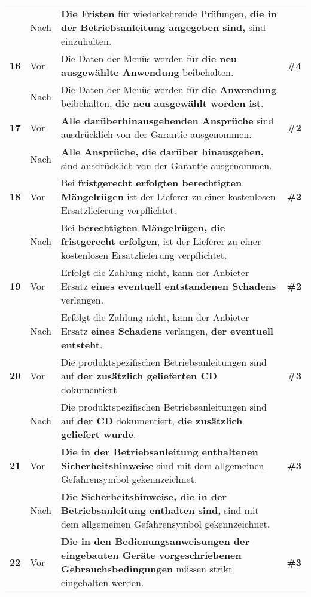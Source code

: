 \begin{longtable}{llp{}l}
& Nach & \textbf{Die Fristen} für wiederkehrende Prüfungen, \textbf{die in der Betriebsanleitung angegeben sind,} sind einzuhalten. & \\
\tablevspace
{ \textbf{16}} & Vor & Die Daten der Menüs werden für \textbf{die neu ausgewählte Anwendung} beibehalten. & \textbf{\#4}\\
& Nach & Die Daten der Menüs werden für \textbf{die Anwendung} beibehalten, \textbf{die neu ausgewählt worden ist}. & \\
\tablevspace
{ \textbf{17}} & Vor & \textbf{Alle darüberhinausgehenden Ansprüche} sind ausdrücklich von der Garantie ausgenommen. & \textbf{\#2}\\
& Nach & \textbf{Alle Ansprüche, die darüber hinausgehen,} sind ausdrücklich von der Garantie ausgenommen. & \\
\tablevspace
{ \textbf{18}} & Vor & Bei \textbf{fristgerecht erfolgten berechtigten Mängelrügen} ist der Lieferer zu einer kostenlosen Ersatzlieferung verpflichtet. & \textbf{\#2}\\
& Nach & Bei \textbf{berechtigten Mängelrügen, die fristgerecht erfolgen}, ist der Lieferer zu einer kostenlosen Ersatzlieferung verpflichtet. & \\
\tablevspace
{ \textbf{19}} & Vor & Erfolgt die Zahlung nicht, kann der Anbieter Ersatz \textbf{eines eventuell entstandenen Schadens} verlangen. & \textbf{\#2}\\
& Nach & Erfolgt die Zahlung nicht, kann der Anbieter Ersatz \textbf{eines Schadens} verlangen, \textbf{der eventuell entsteht}. & \\
\tablevspace
{ \textbf{20}} & Vor & Die produktspezifischen Betriebsanleitungen sind auf \textbf{der zusätzlich gelieferten CD} dokumentiert. & \textbf{\#3}\\
& Nach & Die produktspezifischen Betriebsanleitungen sind auf \textbf{der CD} dokumentiert, \textbf{die zusätzlich geliefert wurde}. & \\
\tablevspace
{ \textbf{21}} & Vor & \textbf{Die in der Betriebsanleitung enthaltenen Sicherheitshinweise} sind mit dem allgemeinen Gefahrensymbol gekennzeichnet. & \textbf{\#3}\\
& Nach & \textbf{Die Sicherheitshinweise, die in der Betriebsanleitung enthalten sind,} sind mit dem allgemeinen Gefahrensymbol gekennzeichnet. & \\
\tablevspace
{ \textbf{22}} & Vor & \textbf{Die in den Bedienungsanweisungen der eingebauten Geräte vorgeschriebenen Gebrauchsbedingungen} müssen strikt eingehalten werden. & \textbf{\#3}\\

\end{longtable}
